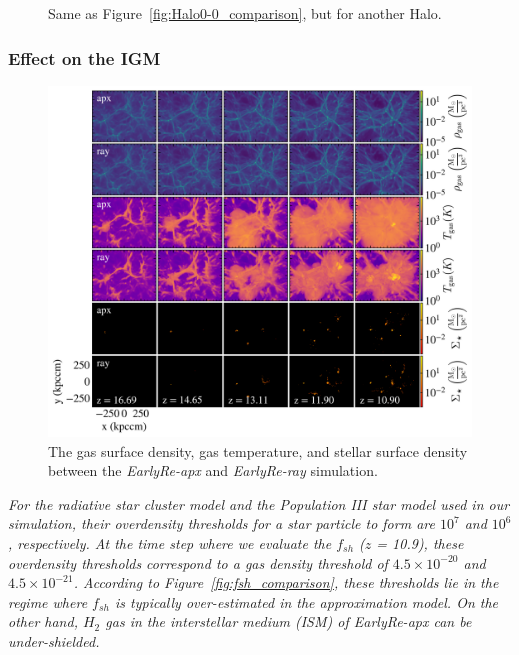 \documentclass[linenumbers, twocolumn]{aastex631}
\begin{document}
\begin{figure}
    \caption{Same as Figure~\ref{fig:Halo0-0_comparison}, but for another Halo.}
    \label{fig:Halo3-3_comparison}
\end{figure}


\subsubsection{Effect on the IGM}

\begin{figure}
    \centering
    \includegraphics[width=\textwidth]{EarlyRe/gas_star_surface_density_multiple.png}
    \caption{The gas surface density, gas temperature, and stellar surface density between the \textit{EarlyRe-apx} and \textit{EarlyRe-ray} simulation.}
    \label{fig:gas_star_surface_density_194}
\end{figure}

\textit{For the radiative star cluster model and the Population III star model used in our simulation, their overdensity thresholds for a star particle to form are $10^{7}$ and $10^{6}$, respectively. At the time step where we evaluate the $f_{sh}$ ($z$ = 10.9), these overdensity thresholds correspond to a gas density threshold of $4.5\times 10^{-20}$ and $4.5\times 10^{-21}$. According to Figure~\ref{fig:fsh_comparison}, these thresholds lie in the regime where $f_{sh}$ is typically over-estimated in the approximation model. On the other hand, $H_{2}$ gas in the interstellar medium (ISM) of \textit{EarlyRe-apx} can be under-shielded.} 
\end{document}
